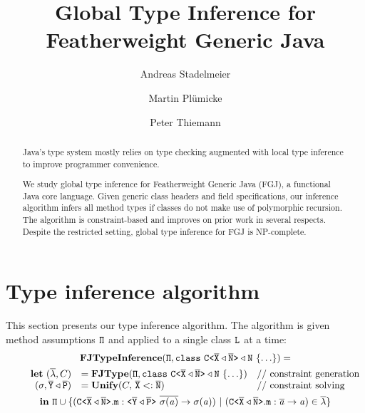 \documentclass[a4paper,USenglish,cleveref, autoref, thm-restate]{lipics-v2021}
\title{Global Type Inference for Featherweight Generic Java} %
\author{Andreas Stadelmeier}{DHBW Stuttgart, Campus Horb, Germany}{a.stadelmeier@hb.dhbw-stuttgart.de}{}{}%
\author{Martin Plümicke}{DHBW Stuttgart, Campus Horb, Germany}{pl@dhbw.de}{}{}
\author{Peter Thiemann}{Universität Freiburg, Institut für Informatik, Germany}{thiemann@informatik.uni-freiburg.de}{}{}
\begin{document}
\maketitle

\begin{abstract}
  Java's type system mostly relies on type checking augmented with
  local type inference to improve programmer convenience.

  We study global type inference for Featherweight Generic Java (FGJ), a
  functional Java core language. Given generic class headers and field
  specifications, our inference algorithm infers all method types if
  classes do not make use of polymorphic recursion.
  The algorithm is constraint-based and improves on prior work in
  several respects. Despite the restricted setting, global type
  inference for FGJ is NP-complete.
\end{abstract}







\section{Type inference algorithm}
\label{sec:type-infer-algor}
This section presents our type inference algorithm.
The algorithm is given method assumptions ${\tt \Pi}$ and applied to a
single class ${\tt L}$ at a time:
\begin{gather*}
\fjtypeinference(\mv{\Pi}, \texttt{class}\ \exptype{C}{\ol{X}
\triangleleft \ol{N}} \triangleleft \type{N}\ \{ \ldots \}) = \\
\quad \quad \begin{array}[t]{rll}
  \textbf{let}\ 
  (\overline{\methodAssumption}, \consSet) &= \fjtype{}(\mv{\Pi}, \texttt{class}\ \exptype{C}{\ol{X}
  \triangleleft \ol{N}} \triangleleft \type{N}\ \{ \ldots \}) &
                                                                     \text{// constraint generation}\\
              {(\sigma,  \ol{Y} \triangleleft \ol{P})} &= \unify{}(\consSet,\, \ol{X} <: \ol{N}) & \text{// constraint solving}\\
\end{array}\\
\textbf{in}\ \mv\Pi \cup
\set{(\exptype{C}{\ol{X} \triangleleft \ol{N}}.\mv{m} : \exptype{}{\ol{Y} \triangleleft \ol{P}}\ \ol{\sigma(\tv{a})} \to \sigma(\tv{a})) \ |\ (\exptype{C}{\ol{X} \triangleleft \ol{N}}.\mv{m} : \ol{\tv{a}} \to \tv{a}) \in \overline{\methodAssumption}}
\end{gather*}
\end{document}
